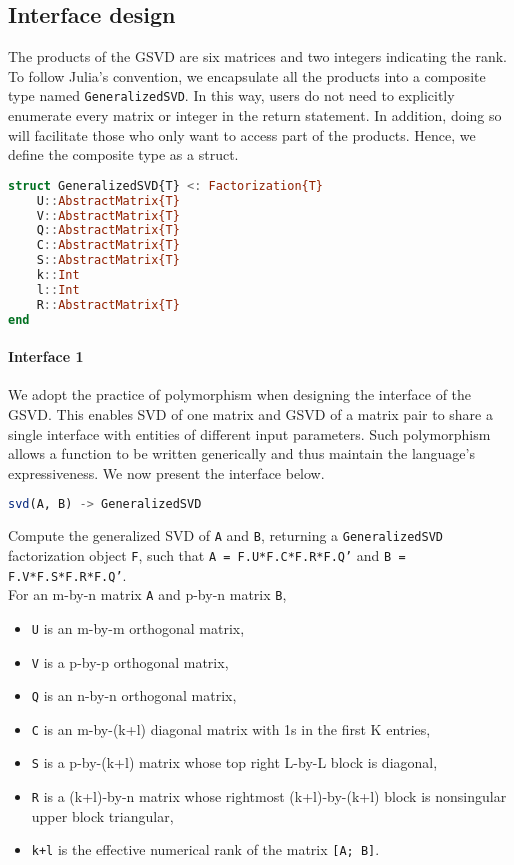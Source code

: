 \subsection{Interface design}
The products of the GSVD are six matrices and two integers indicating the rank. To follow Julia's convention, we encapsulate all the products into a composite type named \texttt{GeneralizedSVD}. In this way, users do not need to explicitly enumerate every matrix or integer in the return statement. In addition, doing so will facilitate those who only want to access part of the products. Hence, we define the composite type as a struct. 

\begin{lstlisting}[language=julia, style=jlcodestyle]
struct GeneralizedSVD{T} <: Factorization{T}
    U::AbstractMatrix{T}
    V::AbstractMatrix{T}
    Q::AbstractMatrix{T}
    C::AbstractMatrix{T}
    S::AbstractMatrix{T}
    k::Int
    l::Int
    R::AbstractMatrix{T}
end
\end{lstlisting}

\paragraph{Interface 1} We adopt the practice of polymorphism when designing the interface of the GSVD. This enables SVD of one matrix and GSVD of a matrix pair to share a single interface with entities of different input parameters. Such polymorphism allows a function to be written generically and thus maintain the language's expressiveness. We now present the interface below.

\begin{lstlisting}[language=julia, style=jlcodestyle]
svd(A, B) -> GeneralizedSVD
\end{lstlisting}

Compute the generalized SVD of \texttt{A} and \texttt{B}, returning a \texttt{GeneralizedSVD} factorization object \texttt{F}, such that \texttt{A = F.U*F.C*F.R*F.Q'} and \texttt{B = F.V*F.S*F.R*F.Q'}. \\

For an m-by-n matrix \texttt{A} and p-by-n matrix \texttt{B},

    \begin{itemize}
        \item \texttt{U} is an m-by-m orthogonal matrix,
        \item \texttt{V} is a p-by-p orthogonal matrix,
        \item \texttt{Q} is an n-by-n orthogonal matrix,
        \item \texttt{C} is an m-by-(k+l) diagonal matrix with 1s in the first K entries,
        \item \texttt{S} is a p-by-(k+l) matrix whose top right L-by-L block is diagonal,
        \item \texttt{R} is a (k+l)-by-n matrix whose rightmost (k+l)-by-(k+l) block is nonsingular upper block triangular,
        \item \texttt{k+l} is the effective numerical rank of the matrix \texttt{[A; B]}.
    \end{itemize}
    

